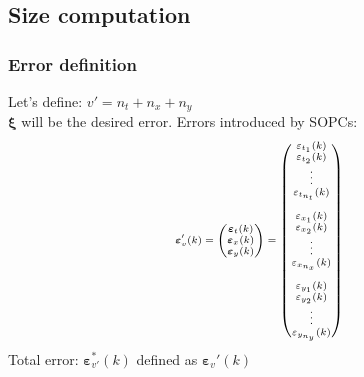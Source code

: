 
\subsection{Size computation}
\begin{frame}
	\frametitle{Error definition}
	Let's define: $v'= n_t + n_x + n_y$ \\
	$\boldsymbol{\xi}$ will be the desired error.
	Errors introduced by SOPCs:
	\begin{equation}
		\scriptsize
		\boldsymbol{\varepsilon}_v'(k) =
		\begin{pmatrix}
			\boldsymbol{\varepsilon}_t(k) \\
			\boldsymbol{\varepsilon}_x(k) \\
			\boldsymbol{\varepsilon}_y(k) \\
		\end{pmatrix}
		=
		\begin{pmatrix}
			{\varepsilon}_{t_1}(k) \\
			{\varepsilon}_{t_2}(k) \\
			\vdots \\
			{\varepsilon}_{t_{n_t}}(k) \\
			\hspace{5pt} \\
			{\varepsilon}_{x_1}(k) \\
			{\varepsilon}_{x_2}(k) \\
			\vdots \\
			{\varepsilon}_{x_{n_x}}(k) \\
			\hspace{5pt} \\
			{\varepsilon}_{y_1}(k) \\
			{\varepsilon}_{y_2}(k) \\
			\vdots \\
			{\varepsilon}_{y_{n_y}}(k) \\
		\end{pmatrix}
	\end{equation}
	Total error: $\boldsymbol{\varepsilon}_{v'}^*(k)$ defined as $\boldsymbol{\varepsilon}_v'(k)$
\end{frame}

